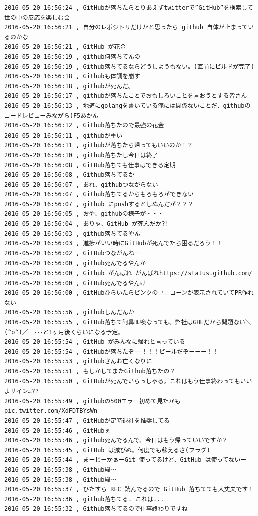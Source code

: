 \begin{verbatim}
2016-05-20 16:56:24 , GitHubが落ちたらとりあえずtwitterで”GitHub”を検索して世の中の反応を楽しむ会
2016-05-20 16:56:21 , 自分のレポジトリだけかと思ったら github 自体が止まっているのかな
2016-05-20 16:56:21 , GitHub が花金
2016-05-20 16:56:19 , github何落ちてんの
2016-05-20 16:56:19 , Github落ちてるならどうしようもない。(直前にビルドが完了)
2016-05-20 16:56:18 , Githubも体調を崩す
2016-05-20 16:56:18 , githubが死んだ。
2016-05-20 16:56:17 , githubが落ちたことでおもしろいことを言おうとする皆さん
2016-05-20 16:56:13 , 地道にgolangを書いている俺には関係ないことだ、githubのコードレビューみながら(F5あかん
2016-05-20 16:56:12 , Github落ちたので最強の花金
2016-05-20 16:56:11 , githubが重い
2016-05-20 16:56:11 , githubが落ちたら帰ってもいいのか！？
2016-05-20 16:56:10 , github落ちたし今日は終了
2016-05-20 16:56:08 , GitHub落ちても仕事はできる定期
2016-05-20 16:56:08 , Github落ちてるか
2016-05-20 16:56:07 , あれ、githubつながらない
2016-05-20 16:56:07 , Github落ちてるからもろもろができない
2016-05-20 16:56:07 , github にpushするとしぬんだが？？？
2016-05-20 16:56:05 , おや、githubの様子が・・・
2016-05-20 16:56:04 , ありゃ、GitHub が死んだか?!
2016-05-20 16:56:03 , github落ちてるやん
2016-05-20 16:56:03 , 進捗がいい時にGitHubが死んでたら困るだろう！！
2016-05-20 16:56:02 , GitHubつながんねー
2016-05-20 16:56:00 , github死んでるやんか
2016-05-20 16:56:00 , Github がんばれ がんばれhttps://status.github.com/ 
2016-05-20 16:56:00 , GitHub死んでるやんけ
2016-05-20 16:56:00 , GitHubひらいたらピンクのユニコーンが表示されていてPR作れない
2016-05-20 16:55:56 , githubしんだんか
2016-05-20 16:55:55 , GitHub落ちて阿鼻叫喚なっても、弊社はGHEだから問題ない＼(^o^)／　･･･と1ヶ月後くらいになる予定。
2016-05-20 16:55:54 , GitHub がみんなに帰れと言っている
2016-05-20 16:55:54 , GitHubが落ちたぞ−−！！！ビールだぞーーー！！
2016-05-20 16:55:53 , githubさんお亡くなりに
2016-05-20 16:55:51 , もしかしてまたGithub落ちたの？
2016-05-20 16:55:50 , GitHubが死んでいらっしゃる。これはもう仕事終わってもいいよサイン…??
2016-05-20 16:55:49 , githubの500エラー初めて見たかもpic.twitter.com/XdFDTBYsWn
2016-05-20 16:55:47 , GitHubが定時退社を推奨してる
2016-05-20 16:55:46 , GitHubぇ
2016-05-20 16:55:46 , github死んでるんで、今日はもう帰っていいですか？
2016-05-20 16:55:45 , GitHub は滅びぬ。何度でも蘇えるさ(フラグ)
2016-05-20 16:55:44 , まーじーかぁーGit 使ってるけど、GitHub は使ってないー
2016-05-20 16:55:38 , Github殿〜
2016-05-20 16:55:38 , Github殿〜
2016-05-20 16:55:37 , ひたすら RFC 読んでるので GitHub 落ちてても大丈夫です！
2016-05-20 16:55:36 , github落ちてる. これは...
2016-05-20 16:55:32 , Github落ちてるので仕事終わりですね

\end{verbatim}
